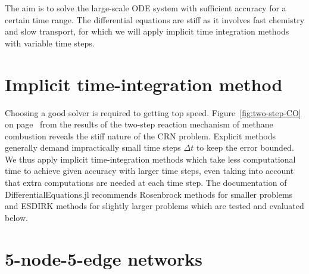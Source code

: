 The aim is to solve the large-scale ODE system with sufficient accuracy for a certain time range. The differential equations are stiff as it involves fast chemistry and slow transport, for which we will apply implicit time integration methods with variable time steps.

\section{Implicit time-integration method}

Choosing a good solver is required to getting top speed. Figure~\ref{fig:two-step-CO} on page~\pageref{fig:two-step-CO} from the results of the two-step reaction mechanism of methane combustion reveals the stiff nature of the CRN problem. Explicit methods generally demand impractically small time steps $\Delta t$ to keep the error bounded. We thus apply implicit time-integration methods which take less computational time to achieve given accuracy with larger time steps, even taking into account that extra computations are needed at each time step. The documentation of DifferentialEquations.jl recommends Rosenbrock methods for smaller problems and ESDIRK methods for slightly larger problems which are tested and evaluated below.

\section{5-node-5-edge networks} \label{sec:5network}

